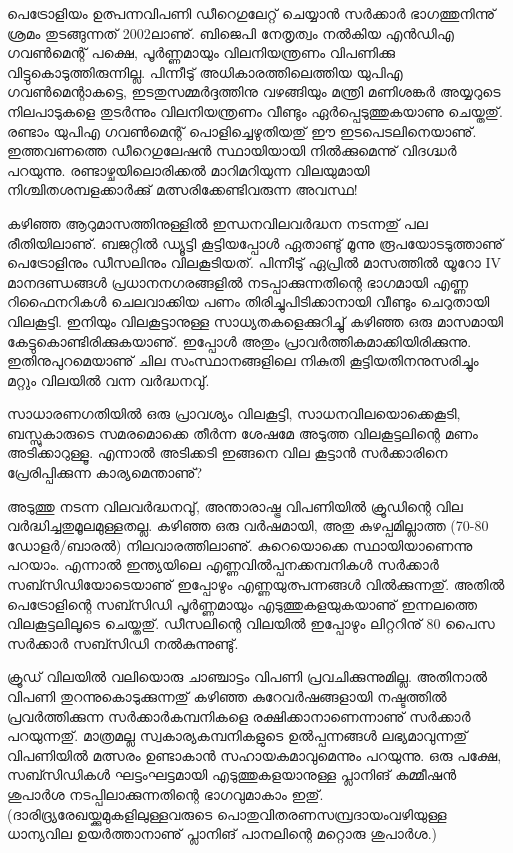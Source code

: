 ﻿
\vskip 2pt

\hspace*{3em}\parbox{8.5cm}{
\small
പെട്രോളിയം ഉത്പന്നവിപണി ഡീറെഗുലേറ്റ് ചെയ്യാന്‍ സര്‍ക്കാര്‍ ഭാഗത്തുനിന്നു് ശ്രമം തുടങ്ങുന്നത് 2002ലാണു്. 
ബിജെപി നേതൃത്വം നല്‍കിയ എന്‍ഡിഎ ഗവണ്‍മെന്റ് പക്ഷെ, പൂര്‍ണ്ണമായും വിലനിയന്ത്രണം വിപണിക്കു 
വിട്ടുകൊടുത്തിരുന്നില്ല. പിന്നീടു് അധികാരത്തിലെത്തിയ യുപിഎ ഗവണ്‍മെന്റാകട്ടെ, ഇടതുസമ്മര്‍ദ്ദത്തിനു വഴങ്ങിയും 
മന്ത്രി മണിശങ്കര്‍ അയ്യറുടെ നിലപാടുകളെ തുടര്‍ന്നും വിലനിയന്ത്രണം വീണ്ടും ഏര്‍പ്പെടുത്തുകയാണു ചെയ്തതു്. രണ്ടാം 
യുപിഎ ഗവണ്‍മെന്റ് പൊളിച്ചെഴുതിയതു് ഈ ഇടപെടലിനെയാണു്. ഇത്തവണത്തെ ഡീറെഗുലേഷന്‍ സ്ഥായിയായി
നില്‍ക്കുമെന്നു് വിദഗ്ദ്ധര്‍ പറയുന്നു. രണ്ടാഴ്ചയിലൊരിക്കല്‍ മാറിമറിയുന്ന വിലയുമായി നിശ്ചിതശമ്പളക്കാര്‍ക്കു് 
മത്സരിക്കേണ്ടിവരുന്ന അവസ്ഥ!
}

{\vskip 14pt}
\hspace*{-1.5em}കഴിഞ്ഞ ആറുമാസത്തിനുള്ളില്‍ ഇന്ധനവിലവര്‍ദ്ധന നടന്നതു് പല രീതിയിലാണു്. ബജറ്റില്‍ ഡ്യൂട്ടി കൂട്ടിയപ്പോള്‍ 
ഏതാണ്ടു് മൂന്നു രൂപയോടടുത്താണു് പെട്രോളിനും ഡീസലിനും വിലകൂടിയത്. പിന്നീടു് ഏപ്രില്‍ മാസത്തില്‍ യൂറോ IV 
മാനദണ്ഡങ്ങള്‍ പ്രധാനനഗരങ്ങളില്‍ നടപ്പാക്കുന്നതിന്റെ ഭാഗമായി എണ്ണ റിഫൈനറികള്‍ ചെലവാക്കിയ പണം 
തിരിച്ചുപിടിക്കാനായി വീണ്ടും ചെറുതായി വിലകൂട്ടി. ഇനിയും വിലകൂട്ടാനുള്ള സാധ്യതകളെക്കുറിച്ചു് കഴിഞ്ഞ ഒരു മാസമായി
കേട്ടുകൊണ്ടിരിക്കുകയാണു്. ഇപ്പോള്‍ അതും പ്രാവര്‍ത്തികമാക്കിയിരിക്കുന്നു. ഇതിനുപുറമെയാണു് ചില സംസ്ഥാനങ്ങളിലെ
നികുതി കൂട്ടിയതിനനുസരിച്ചും മറ്റും വിലയില്‍ വന്ന വര്‍ദ്ധനവു്.

സാധാരണഗതിയില്‍ ഒരു പ്രാവശ്യം വിലകൂട്ടി, സാധനവിലയൊക്കെകൂടി, ബസ്സുകാരുടെ സമരമൊക്കെ തീര്‍ന്ന 
ശേഷമേ അടുത്ത വിലകൂട്ടലിന്റെ മണം അടിക്കാറുള്ളൂ. എന്നാല്‍ അടിക്കടി ഇങ്ങനെ വില കൂട്ടാന്‍ സര്‍ക്കാരിനെ 
പ്രേരിപ്പിക്കുന്ന കാര്യമെന്താണു്?

അടുത്തു നടന്ന വിലവര്‍ദ്ധനവു്, അന്താരാഷ്ട്ര വിപണിയില്‍ ക്രൂഡിന്റെ വില വര്‍ദ്ധിച്ചതുമൂലമുള്ളതല്ല. കഴിഞ്ഞ ഒരു 
വര്‍ഷമായി, അതു കുഴപ്പമില്ലാത്ത (70-80 ഡോളര്‍/ബാരല്‍) നിലവാരത്തിലാണു്. കുറെയൊക്കെ സ്ഥായിയാണെന്നു
പറയാം. എന്നാല്‍ ഇന്ത്യയിലെ എണ്ണവില്‍പ്പനക്കമ്പനികള്‍ സര്‍ക്കാര്‍ സബ്സിഡിയോടെയാണു് ഇപ്പോഴും 
എണ്ണയുത്പന്നങ്ങള്‍ വില്‍ക്കുന്നതു്. അതില്‍ പെട്രോളിന്റെ സബ്സിഡി പൂര്‍ണ്ണമായും എടുത്തുകളയുകയാണു് 
ഇന്നലത്തെ വിലകൂട്ടലിലൂടെ ചെയ്തതു്. ഡീസലിന്റെ വിലയില്‍ ഇപ്പോഴും ലിറ്ററിനു് 80 പൈസ സര്‍ക്കാര്‍ 
സബ്സിഡി നല്‍കുന്നുണ്ടു്.

ക്രൂഡ് വിലയില്‍ വലിയൊരു ചാഞ്ചാട്ടം വിപണി പ്രവചിക്കുന്നുമില്ല. അതിനാല്‍ വിപണി തുറന്നുകൊടുക്കുന്നതു് 
കഴിഞ്ഞ കുറേവര്‍ഷങ്ങളായി നഷ്ടത്തില്‍ പ്രവര്‍ത്തിക്കുന്ന സര്‍ക്കാര്‍കമ്പനികളെ രക്ഷിക്കാനാണെന്നാണു് സര്‍ക്കാര്‍ 
പറയുന്നതു്. മാത്രമല്ല സ്വകാര്യകമ്പനികളുടെ ഉല്‍പ്പന്നങ്ങള്‍ ലഭ്യമാവുന്നതു് വിപണിയില്‍ മത്സരം ഉണ്ടാകാന്‍ 
സഹായകമാവുമെന്നും പറയുന്നു. ഒരു പക്ഷേ, സബ്സിഡികള്‍ ഘട്ടംഘട്ടമായി എടുത്തുകളയാനുള്ള പ്ലാനിങ് 
കമ്മീഷന്‍ ശുപാര്‍ശ നടപ്പിലാക്കുന്നതിന്റെ ഭാഗവുമാകാം ഇതു്. (ദാരിദ്ര്യരേഖയ്ക്കുമുകളിലുള്ളവരുടെ പൊതുവിതരണസമ്പ്രദായംവഴിയുള്ള ധാന്യവില ഉയര്‍ത്താനാണു് പ്ലാനിങ് പാനലിന്റെ മറ്റൊരു ശുപാര്‍ശ.)

